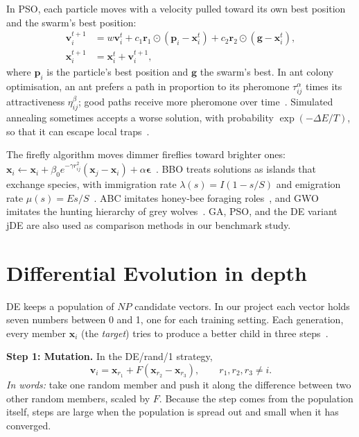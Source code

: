 In PSO, each particle moves with a velocity pulled toward its own best position and the swarm's best position:
\begin{align}
\mathbf v_i^{t+1}&=w\mathbf v_i^t+c_1\mathbf r_1\odot(\mathbf p_i-\mathbf x_i^t)+c_2\mathbf r_2\odot(\mathbf g-\mathbf x_i^t),\\
\mathbf x_i^{t+1}&=\mathbf x_i^t+\mathbf v_i^{t+1},
\end{align}
where $\mathbf p_i$ is the particle's best position and $\mathbf g$ the swarm's best. In ant colony optimisation, an ant prefers a path in proportion to its pheromone $\tau_{ij}^{\alpha}$ times its attractiveness $\eta_{ij}^{\beta}$; good paths receive more pheromone over time~\cite{dorigo1996aco}. Simulated annealing sometimes accepts a worse solution, with probability $\exp(-\Delta E/T)$, so that it can escape local traps~\cite{kirkpatrick1983annealing}.

The firefly algorithm moves dimmer fireflies toward brighter ones: $\mathbf x_i\leftarrow\mathbf x_i+\beta_0e^{-\gamma r_{ij}^2}(\mathbf x_j-\mathbf x_i)+\alpha\boldsymbol\epsilon$~\cite{yang2009firefly}. BBO treats solutions as islands that exchange species, with immigration rate $\lambda(s)=I(1-s/S)$ and emigration rate $\mu(s)=Es/S$~\cite{simon2008bbo}. ABC imitates honey-bee foraging roles~\cite{karaboga2007abc}, and GWO imitates the hunting hierarchy of grey wolves~\cite{mirjalili2014gwo}. GA, PSO, and the DE variant jDE are also used as comparison methods in our benchmark study.

\section{Differential Evolution in depth}
DE keeps a population of $NP$ candidate vectors. In our project each vector holds seven numbers between 0 and 1, one for each training setting. Each generation, every member $\mathbf x_i$ (the \emph{target}) tries to produce a better child in three steps~\cite{storn1997de,das2011survey}.

\textbf{Step 1: Mutation.} In the DE/rand/1 strategy,
\begin{equation}
\mathbf v_i=\mathbf x_{r_1}+F(\mathbf x_{r_2}-\mathbf x_{r_3}),\qquad r_1,r_2,r_3\ne i .
\end{equation}
\emph{In words:} take one random member and push it along the difference between two other random members, scaled by $F$. Because the step comes from the population itself, steps are large when the population is spread out and small when it has converged.

